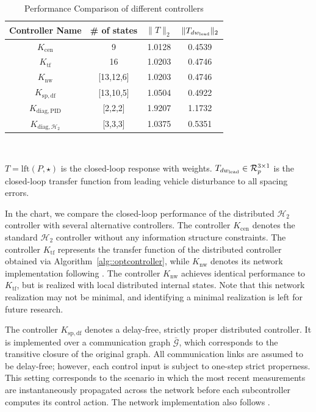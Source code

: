 \begin{table}[!h]
\begin{center}\label{Tab::ExampleResult}
\caption{Performance Comparison of different controllers}
\begin{tabular}{c c c c}
\hline
Controller Name & \# of states & \(\|T\|_2\) & \(\|T_{dw_{\rm{lead}}}\|_2\)\\ 
\hline
\(K_\mathrm{cen}\) & 9 & 1.0128 & 0.4539\\  
\(K_\mathrm{tf}\) & 16 & 1.0203 & 0.4746\\  
\(K_\mathrm{nw}\) & [13,12,6] & 1.0203 & 0.4746\\
\(K_\mathrm{sp,df}\) & [13,10,5] & 1.0504 & 0.4922\\ 
\(K_{\mathrm{diag,PID}}\) & [2,2,2] & 1.9207 & 1.1732\\
\(K_{\mathrm{diag},\mathcal{H}_2}\) & [3,3,3] & 1.0375 & 0.5351\\
\hline
\end{tabular}\\
\end{center}
\(T = \mathrm{lft}(P,\star)\) is the closed-loop response with weights.
\(T_{dw_{\rm{lead}}} \in \mathcal{R}_p^{3\times 1}\) is the closed-loop transfer function from leading vehicle disturbance to all spacing errors. 
\end{table}

In the chart, we compare the closed-loop performance of the distributed $\mathcal{H}_2$ controller with several alternative controllers. 
The controller $K_{\mathrm{cen}}$ denotes the standard $\mathcal{H}_2$ controller without any information structure constraints. 
The controller $K_{\mathrm{tf}}$ represents the transfer function of the distributed controller obtained via Algorithm~\ref{alg::optcontroller}, 
while $K_{\mathrm{nw}}$ denotes its network implementation following \cite{Vamsi_Realizable}. 
The controller $K_{\mathrm{nw}}$ achieves identical performance to $K_{\mathrm{tf}}$, but is realized with local distributed internal states. 
Note that this network realization may not be minimal, and identifying a minimal realization is left for future research.

The controller $K_{\mathrm{sp,df}}$ denotes a delay-free, strictly proper distributed controller. 
It is implemented over a communication graph $\bar{\mathcal{G}}$, which corresponds to the transitive closure of the original graph. 
All communication links are assumed to be delay-free; however, each control input is subject to one-step strict properness. 
This setting corresponds to the scenario in which the most recent measurements are instantaneously propagated across the network before each subcontroller computes its control action. The network implementation also follows \cite{Vamsi_Realizable}.

